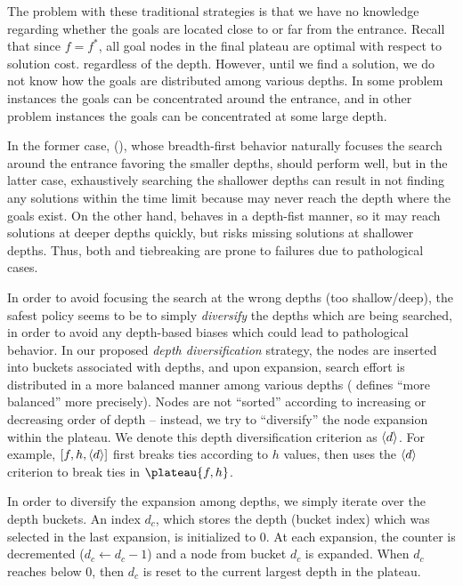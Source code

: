 The problem with these traditional strategies is that we have no knowledge
regarding whether the goals are located close to or far from the entrance. Recall
that since $f=f^*$, all goal nodes in the final plateau are optimal with respect to solution cost.
regardless of the depth.%
However, until we find a
solution, we do not know how the goals are distributed among various
depths. In some problem instances the goals can be concentrated around
the entrance, and in other problem instances the goals can be
concentrated at some large depth. %

In the former case, (\fifo), whose breadth-first behavior naturally
focuses the search around the entrance favoring the smaller depths,
should perform well, but in the latter case, exhaustively searching
the shallower depths can result in not finding any solutions within
the time limit because \fifo may never reach the depth where the goals
exist.  On the other hand, \lifo behaves in a depth-fist manner, so it
may reach solutions at deeper depths quickly, but risks missing
solutions at shallower depths.  Thus, both \fifo and \lifo tiebreaking
are prone to failures due to pathological cases.

In order to avoid focusing the search at the wrong depths (too shallow/deep), 
the safest policy seems to be to simply \emph{diversify} the depths which are being searched,
in order to avoid any depth-based biases which could lead to pathological behavior.
In our proposed \emph{depth diversification} strategy, the nodes are inserted into buckets
associated with depths, and upon expansion, search effort is distributed in a more balanced manner
among various depths ( defines ``more balanced''  more precisely).
Nodes are not  ``sorted''
according to increasing or decreasing order of depth -- instead, we try to 
``diversify'' the node expansion within the plateau.
We denote this depth diversification criterion as ${\left<d\right>}$. 
For example, $[f,h,{\left<d\right>}]$ first breaks ties according to $h$ values,
then uses the ${\left<d\right>}$ criterion to break ties in $\plateau{f,h}$.

In order to diversify the expansion among depths, we simply
iterate over the depth buckets. An index $d_c$,
 which stores the depth (bucket index)  which was selected in the last expansion,
is initialized to 0.
At each expansion, the counter is decremented ($d_c\leftarrow d_c-1$) and
a node from  bucket $d_c$ is expanded. When $d_c$ reaches below 0, then $d_c$
is reset to the current largest depth in the plateau.

